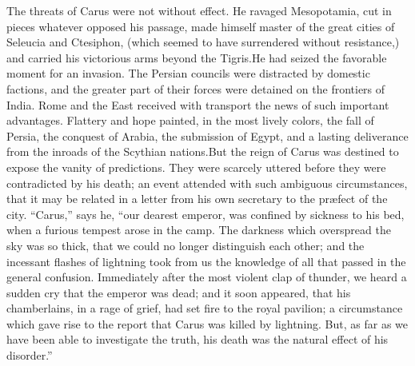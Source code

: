 
The threats of Carus were not without effect. He ravaged
Mesopotamia, cut in pieces whatever opposed his passage, made
himself master of the great cities of Seleucia and Ctesiphon,
(which seemed to have surrendered without resistance,) and
carried his victorious arms beyond the Tigris.\footnotemark[74] He had seized
the favorable moment for an invasion. The Persian councils were
distracted by domestic factions, and the greater part of their
forces were detained on the frontiers of India. Rome and the East
received with transport the news of such important advantages.
Flattery and hope painted, in the most lively colors, the fall of
Persia, the conquest of Arabia, the submission of Egypt, and a
lasting deliverance from the inroads of the Scythian nations.\footnotemark[75]
But the reign of Carus was destined to expose the vanity of
predictions. They were scarcely uttered before they were
contradicted by his death; an event attended with such ambiguous
circumstances, that it may be related in a letter from his own
secretary to the præfect of the city. “Carus,” says he, “our
dearest emperor, was confined by sickness to his bed, when a
furious tempest arose in the camp. The darkness which overspread
the sky was so thick, that we could no longer distinguish each
other; and the incessant flashes of lightning took from us the
knowledge of all that passed in the general confusion.
Immediately after the most violent clap of thunder, we heard a
sudden cry that the emperor was dead; and it soon appeared, that
his chamberlains, in a rage of grief, had set fire to the royal
pavilion; a circumstance which gave rise to the report that Carus
was killed by lightning. But, as far as we have been able to
investigate the truth, his death was the natural effect of his
disorder.”\footnotemark[76]



